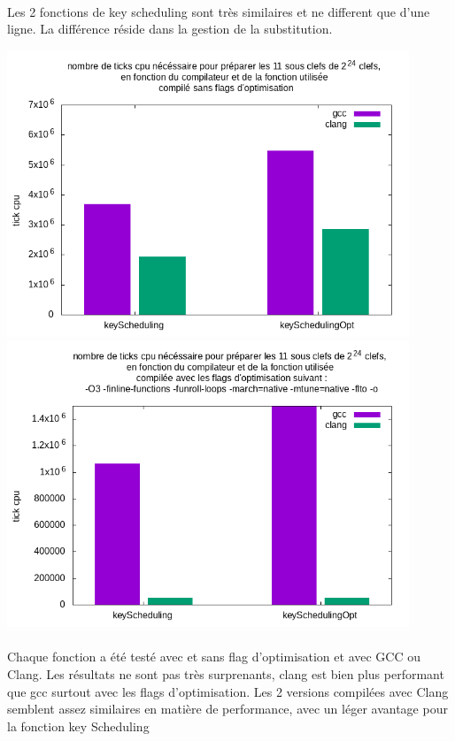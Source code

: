 \documentclass{report}
\begin{document}
\paragraph{} Les 2 fonctions de key scheduling sont très similaires et ne different que d'une ligne. 
La différence réside dans la gestion de la substitution.

\includegraphics[width=12cm]{../src/benchmarks/keyScheduling/img/keyScheduling.png} \\ 
\includegraphics[width=12cm]{../src/benchmarks/keyScheduling/img/keyScheduling_opti.png}

\paragraph{} Chaque fonction a été testé avec et sans flag d'optimisation et avec GCC ou Clang. 
Les résultats ne sont pas très surprenants, clang est bien plus performant que gcc surtout avec les flags d'optimisation.
Les 2 versions compilées avec Clang semblent assez  similaires en matière de performance, avec un léger avantage pour la fonction key Scheduling
\end{document}
